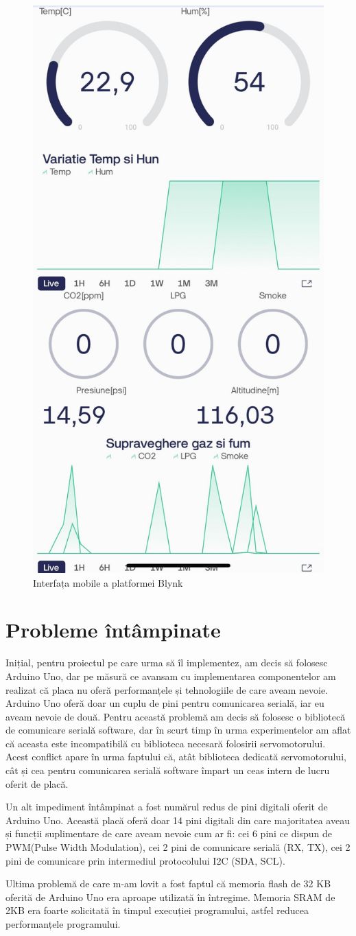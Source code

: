 \begin{figure}[H]
\includegraphics[width=0.3\linewidth]{bachelors_ro/images/interfata_blynk_mobile_full.jpg}
\caption{Interfața mobile a platformei Blynk}
\label{fig:interfata_blynk_mobile_full}
\end{figure}

\section{Probleme întâmpinate}

Inițial, pentru proiectul pe care urma să îl implementez, am decis să folosesc Arduino Uno, dar pe măsură ce avansam cu implementarea componentelor am realizat că placa nu oferă performanțele și tehnologiile de care aveam nevoie. Arduino Uno oferă doar un cuplu de pini pentru comunicarea serială, iar eu aveam nevoie de două. Pentru această problemă am decis să folosesc o bibliotecă de comunicare serială software\cite{software_serial_lib}, dar în scurt timp în urma experimentelor am aflat că aceasta este incompatibilă cu biblioteca necesară folosirii servomotorului\cite{servo_lib}. Acest conflict apare în urma faptului că, atât biblioteca dedicată servomotorului, cât și cea pentru comunicarea serială software împart un ceas intern de lucru oferit de placă.

Un alt impediment întâmpinat a fost numărul redus de pini digitali oferit de Arduino Uno. Această placă oferă doar 14 pini digitali din care majoritatea aveau și funcții suplimentare de care aveam nevoie cum ar fi: cei 6 pini ce dispun de PWM(Pulse Width Modulation), cei 2 pini de comunicare serială (RX, TX), cei 2 pini de comunicare prin intermediul protocolului I2C (SDA, SCL)\cite{uno_pinout}.

Ultima problemă de care m-am lovit a fost faptul că memoria flash de 32 KB oferită de Arduino Uno era aproape utilizată în întregime. Memoria SRAM de 2KB era foarte solicitată în timpul execuției programului, astfel reducea performanțele programului\cite{uno_specs}.